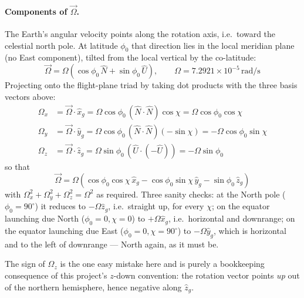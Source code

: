 {\paragraph{Components of $\vec{\Omega}$.} The Earth's angular velocity points along the rotation
axis, i.e.\ toward the celestial north pole. At latitude $\phi_0$ that direction lies in the
local meridian plane (no East component), tilted from the local vertical by the co-latitude:
\begin{equation}
    \vec{\Omega} = \Omega\left(\cos\phi_0\,\hat{N} + \sin\phi_0\,\hat{U}\right), \qquad
    \Omega = 7.2921\times10^{-5}\,\mathrm{rad/s}
\end{equation}
Projecting onto the flight-plane triad by taking dot products with the three basis vectors above:
\begin{align}
    \Omega_x &= \vec{\Omega}\cdot\hat{x}_g
        = \Omega\cos\phi_0\,(\hat{N}\cdot\hat{N})\cos\chi = \Omega\cos\phi_0\cos\chi \\
    \Omega_y &= \vec{\Omega}\cdot\hat{y}_g
        = \Omega\cos\phi_0\,(\hat{N}\cdot\hat{N})(-\sin\chi) = -\Omega\cos\phi_0\sin\chi \\
    \Omega_z &= \vec{\Omega}\cdot\hat{z}_g
        = \Omega\sin\phi_0\,(\hat{U}\cdot(-\hat{U})) = -\Omega\sin\phi_0
\end{align}
so that
\begin{equation} \label{eq:omega_components}
    \vec{\Omega} = \Omega\left(\cos\phi_0\cos\chi\,\hat{x}_g
        - \cos\phi_0\sin\chi\,\hat{y}_g - \sin\phi_0\,\hat{z}_g\right)
\end{equation}
with $\Omega_x^2+\Omega_y^2+\Omega_z^2 = \Omega^2$ as required. Three sanity checks: at the North
pole ($\phi_0 = 90^\circ$) it reduces to $-\Omega\hat{z}_g$, i.e.\ straight up, for every $\chi$;
on the equator launching due North ($\phi_0=0,\chi=0$) to $+\Omega\hat{x}_g$, i.e.\ horizontal and
downrange; on the equator launching due East ($\phi_0=0,\chi=90^\circ$) to $-\Omega\hat{y}_g$,
which is horizontal and to the left of downrange --- North again, as it must be.

The sign of $\Omega_z$ is the one easy mistake here and is purely a bookkeeping consequence of
this project's $z$-down convention: the rotation vector points \emph{up} out of the northern
hemisphere, hence negative along $\hat{z}_g$.

}
